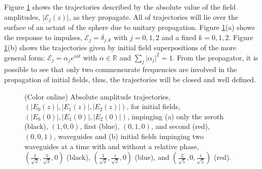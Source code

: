 \documentclass[9pt,twocolumn,twoside]{osajnl}
\begin{document}
Figure \ref{fig: Fig3} shows the trajectories described by the absolute value of the field amplitudes, $\vert \mathcal{E}_{j}(z)\vert$, as they propagate. 
All of trajectories will lie over the surface of an octant of the sphere due to unitary propagation.
Figure \ref{fig: Fig3}(a) shows the response to impulses, $\mathcal{E}_{j} = \delta_{j,k}$ with $j=0,1,2$ and a fixed $k=0,1,2$. 
Figure \ref{fig: Fig3}(b) shows the trajectories given by initial field superpositions of the more general form: $\mathcal{E}_{j} = \alpha_{j} e^{i \phi t}$ with $\alpha \in \mathbb{R}$ and $\sum_{j} \vert \alpha_{j} \vert^{2} =1$.
From the propagator, it is possible to see that only two commensurate frequencies are involved in the propagation of initial fields, thus, the trajectories will be closed and well defined.


\begin{figure}[htbp]
\centering
{}
\caption{(Color online) Absolute amplitude trajectories, $(\vert E_{0}(z) \vert, \vert E_{1}(z) \vert, \vert E_{2}(z) \vert )$, for initial fields, $(\vert E_{0}(0) \vert, \vert E_{1}(0) \vert, \vert E_{2}(0) \vert )$, impinging (a) only the zeroth (black), $(1,0,0)$, first (blue), $(0,1,0)$, and second (red), $(0,0,1)$, waveguides and (b) initial fields impinging two waveguides at a time with and without a relative phase, $(\frac{1}{\sqrt{2}},\frac{1}{\sqrt{2}},0)$ (black), $(\frac{1}{\sqrt{2}},\frac{i}{\sqrt{2}},0)$ (blue), and $(\frac{2}{\sqrt{5}},0,\frac{i}{\sqrt{5}})$ (red).}
\label{fig: Fig3}
\end{figure}
\end{document}
